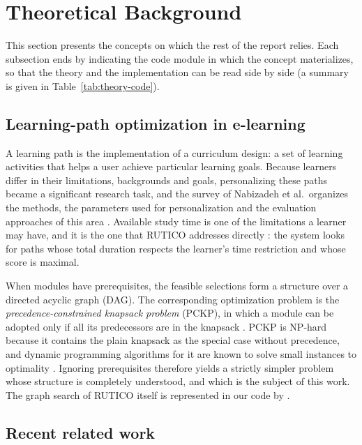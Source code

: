 \section{Theoretical Background}\label{sec:background}

This section presents the concepts on which the rest of the report relies. Each subsection ends by indicating the code module in which the concept materializes, so that the theory and the implementation can be read side by side (a summary is given in Table~\ref{tab:theory-code}).

\subsection{Learning-path optimization in e-learning}

A learning path is the implementation of a curriculum design: a set of learning activities that helps a user achieve particular learning goals. Because learners differ in their limitations, backgrounds and goals, personalizing these paths became a significant research task, and the survey of Nabizadeh et al.\ organizes the methods, the parameters used for personalization and the evaluation approaches of this area \cite{nabizadeh2020survey}. Available study time is one of the limitations a learner may have, and it is the one that RUTICO addresses directly \cite{nabizadeh2017rutico}: the system looks for paths whose total duration respects the learner's time restriction and whose score is maximal.

When modules have prerequisites, the feasible selections form a structure over a directed acyclic graph (DAG). The corresponding optimization problem is the \emph{precedence-constrained knapsack problem} (PCKP), in which a module can be adopted only if all its predecessors are in the knapsack \cite{samphaiboon2000}. PCKP is NP-hard because it contains the plain knapsack as the special case without precedence, and dynamic programming algorithms for it are known to solve small instances to optimality \cite{samphaiboon2000}. Ignoring prerequisites therefore yields a strictly simpler problem whose structure is completely understood, and which is the subject of this work. The graph search of RUTICO itself is represented in our code by .

\subsection{Recent related work}\label{sec:related}

